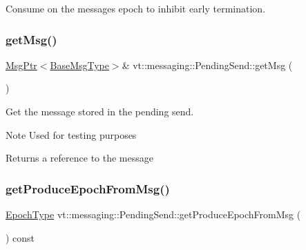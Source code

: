 Consume on the messages epoch to inhibit early termination. 

\mbox{\label{structvt_1_1messaging_1_1_pending_send_a03c34f8761089680983aa701bce424cc}} 
\subsubsection{\texorpdfstring{get\+Msg()}{getMsg()}}
{\footnotesize\ttfamily \hyperlink{namespacevt_a9f5ebd62ee9d6dd8829e3e1cc4f858e9}{Msg\+Ptr}$<$\hyperlink{namespacevt_a44d0d4e144748f2b19a1cfd962f50338}{Base\+Msg\+Type}$>$\& vt\+::messaging\+::\+Pending\+Send\+::get\+Msg (\begin{DoxyParamCaption}{ }\end{DoxyParamCaption})\hspace{0.3cm}{\ttfamily [inline]}}



Get the message stored in the pending send. 

\begin{DoxyNote}{Note}
Used for testing purposes
\end{DoxyNote}
\begin{DoxyReturn}{Returns}
a reference to the message 
\end{DoxyReturn}
\mbox{\label{structvt_1_1messaging_1_1_pending_send_a8293dffe4d8cdc81de573d2edf0ee4cb}} 
\subsubsection{\texorpdfstring{get\+Produce\+Epoch\+From\+Msg()}{getProduceEpochFromMsg()}}
{\footnotesize\ttfamily \hyperlink{namespacevt_a81d11b28122d43bf9834577e4a06440f}{Epoch\+Type} vt\+::messaging\+::\+Pending\+Send\+::get\+Produce\+Epoch\+From\+Msg (\begin{DoxyParamCaption}{ }\end{DoxyParamCaption}) const\hspace{0.3cm}{\ttfamily [private]}}



